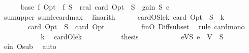 \begin{isabellebody}
\isanewline
\isanewline
\ \ \ \ \isamarkupfalse%
\ base{\isacharcolon}{\kern0pt}\ {\isachardoublequoteopen}f\ Opt\ {\isacharminus}{\kern0pt}\ f\ S\ {\isasymle}\ real\ {\isacharparenleft}{\kern0pt}card\ {\isacharparenleft}{\kern0pt}Opt\ {\isacharminus}{\kern0pt}\ S{\isacharparenright}{\kern0pt}{\isacharparenright}{\kern0pt}\ {\isacharasterisk}{\kern0pt}\ gain\ S\ e{\isachardoublequoteclose}\isanewline
\ \ \ \ \ \ \isamarkupfalse%
\ sum{\isacharunderscore}{\kern0pt}upper\ sum{\isacharunderscore}{\kern0pt}le{\isacharunderscore}{\kern0pt}card{\isacharunderscore}{\kern0pt}max\ \isamarkupfalse%
\ linarith\isanewline
\isanewline
\ \ \ \ \isamarkupfalse%
\ cardOS{\isacharunderscore}{\kern0pt}le{\isacharunderscore}{\kern0pt}k{\isacharcolon}{\kern0pt}\ {\isachardoublequoteopen}card\ {\isacharparenleft}{\kern0pt}Opt\ {\isacharminus}{\kern0pt}\ S{\isacharparenright}{\kern0pt}\ {\isasymle}\ k{\isachardoublequoteclose}\isanewline
\ \ \ \ \isamarkupfalse%
\ {\isacharminus}{\kern0pt}\isanewline
\ \ \ \ \ \ \isamarkupfalse%
\ {\isachardoublequoteopen}card\ {\isacharparenleft}{\kern0pt}Opt\ {\isacharminus}{\kern0pt}\ S{\isacharparenright}{\kern0pt}\ {\isasymle}\ card\ Opt{\isachardoublequoteclose}\isanewline
\ \ \ \ \ \ \ \ \isamarkupfalse%
\ finO\ Diff{\isacharunderscore}{\kern0pt}subset\ \isamarkupfalse%
\ {\isacharparenleft}{\kern0pt}rule\ card{\isacharunderscore}{\kern0pt}mono{\isacharparenright}{\kern0pt}\isanewline
\ \ \ \ \ \ \isamarkupfalse%
\ \isamarkupfalse%
\ {\isachardoublequoteopen}{\isachardot}{\kern0pt}{\isachardot}{\kern0pt}{\isachardot}{\kern0pt}\ {\isasymle}\ k{\isachardoublequoteclose}\ \isamarkupfalse%
\ cardO{\isacharunderscore}{\kern0pt}le{\isacharunderscore}{\kern0pt}k\ \isakeywordONE{{\isachardot}{\kern0pt}}\isamarkupfalse%
\isanewline
\ \ \ \ \ \ \isamarkupfalse%
\ \isamarkupfalse%
\ {\isacharquery}{\kern0pt}thesis\ \isakeywordONE{{\isachardot}{\kern0pt}}\isamarkupfalse%
\isanewline
\ \ \ \ \isamarkupfalse%
\isanewline
\isanewline
\ \ \ \ \isamarkupfalse%
\ eVS{\isacharcolon}{\kern0pt}\ {\isachardoublequoteopen}e\ {\isasymin}\ V\ {\isacharminus}{\kern0pt}\ S{\isachardoublequoteclose}\ \isamarkupfalse%
\ e{\isacharunderscore}{\kern0pt}in\ O{\isacharunderscore}{\kern0pt}sub\ \isamarkupfalse%
\ auto\isanewline
\ \ \ \ \isamarkupfalse%

\end{isabellebody}
